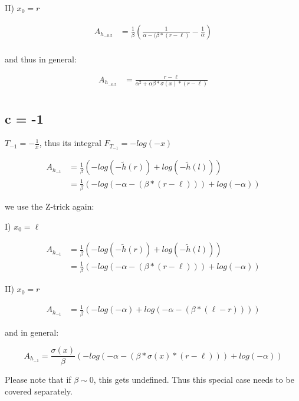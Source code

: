 \documentclass[]{article}
\begin{document}
II) $x_0 = r$

\begin{align*}
A_{h_{-0.5}} & = \frac{1}{\beta} \left(\frac{1}{\alpha - (\beta * (r - \ell)} - \frac{1}{\alpha} \right) \\
\end{align*}

and thus in general:

\begin{align*}
	A_{h_{-0.5}} & = \frac{r - \ell}{\alpha^2 + \alpha \beta * \sigma(x) * (r - \ell)}\\
\end{align*}







\subsection{c = -1}

$T_{-1} = -\frac{1}{x}$, thus its integral $F_{T_{-1}} = - log(-x)$

\begin{align*}
	A_{h_{-1}} &= \frac{1}{\beta} \left(-log(-\tilde{h}(r)) + log(-\tilde{h}(l)) \right) \\
&= \frac{1}{\beta} \left(-log(-\alpha - (\beta * (r - \ell))) + log(-\alpha) \right)
\end{align*}

we use the Z-trick again:

I) $x_0 = \ell$

\begin{align*}
	A_{h_{-1}} &= \frac{1}{\beta} \left(-log(-\tilde{h}(r)) + log(-\tilde{h}(l)) \right) \\
&= \frac{1}{\beta} \left(-log(-\alpha - (\beta * (r - \ell))) + log(-\alpha) \right)
\end{align*}

II) $x_0 = r$

\begin{align*}
A_{h_{-1}} &= \frac{1}{\beta} \left(- log(-\alpha) + log(-\alpha - (\beta * (\ell - r))) \right)
\end{align*}


and in general:

\[
	A_{h_{-1}} = \frac{\sigma(x)}{\beta} \left(-log(-\alpha - (\beta * \sigma(x) * (r - \ell))) + log(-\alpha) \right)
\]

Please note that if $\beta \sim 0$, this gets undefined. Thus this special case needs to be covered separately.
\end{document}
